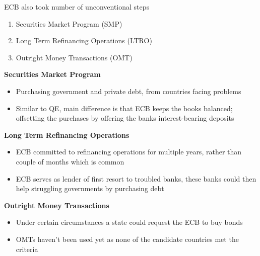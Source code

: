 \documentclass{beamer}
\begin{document}
\begin{frame}
  ECB also took number of unconventional steps
  \begin{enumerate}    
    \item Securities Market Program (SMP)
    \item Long Term Refinancing Operations (LTRO)
    \item Outright Money Transactions (OMT) 
  \end{enumerate}
\end{frame}

\begin{frame}
  \textbf{Securities Market Program}
  \begin{itemize}
    \item Purchasing government and private debt, from countries facing problems
    \item Similar to QE, main difference is that ECB keeps the books balanced; offsetting the purchases by offering the banks interest-bearing deposits
  \end{itemize}
  \medskip
  \textbf{Long Term Refinancing Operations}
  \begin{itemize}
    \item ECB committed to refinancing operations for multiple years, rather than couple of months which is common    
    \item ECB serves as lender of first resort to troubled banks, these banks could then help struggling governments by purchasing debt    
  \end{itemize}
  \medskip  
  \textbf{Outright Money Transactions}
  \begin{itemize}
    \item Under certain circumstances a state could request the ECB to buy bonds     
    \item OMTs haven't been used yet as none of the candidate countries met the criteria
  \end{itemize}
\end{frame}
\end{document}
